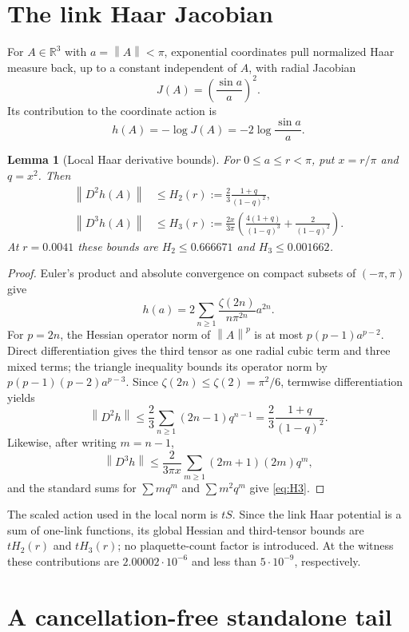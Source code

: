 \documentclass[11pt]{article}
\newtheorem{lemma}[theorem]{Lemma}
\theoremstyle{definition}
\newcommand{\R}{\mathbb{R}}
\newcommand{\norm}[1]{\left\lVert #1\right\rVert}
\begin{document}
\section{The link Haar Jacobian}\label{sec:haar}

For $A\in\R^3$ with $a=\norm A<\pi$, exponential coordinates pull normalized
Haar measure back, up to a constant independent of $A$, with radial Jacobian
\[
 J(A)=\left(\frac{\sin a}{a}\right)^2.
\]
Its contribution to the coordinate action is
\[
 h(A)=-\log J(A)=-2\log\frac{\sin a}{a}.
\]

\begin{lemma}[Local Haar derivative bounds]\label{lem:haar}
For $0\le a\le r<\pi$, put $x=r/\pi$ and $q=x^2$.  Then
\begin{align}
 \norm{D^2h(A)}
 &\le H_2(r):=\frac23\frac{1+q}{(1-q)^2},\label{eq:H2}\\
 \norm{D^3h(A)}
 &\le H_3(r):=\frac{2x}{3\pi}
 \left(\frac{4(1+q)}{(1-q)^3}+\frac{2}{(1-q)^2}\right).
 \label{eq:H3}
\end{align}
At $r=0.0041$ these bounds are $H_2\le0.666671$ and
$H_3\le0.001662$.
\end{lemma}

\begin{proof}
Euler's product and absolute convergence on compact subsets of $(-\pi,\pi)$
give
\[
 h(a)=2\sum_{n\ge1}\frac{\zeta(2n)}{n\pi^{2n}}a^{2n}.
\]
For $p=2n$, the Hessian operator norm of $\norm A^p$ is at most
$p(p-1)a^{p-2}$.  Direct differentiation gives the third tensor as one radial
cubic term and three mixed terms; the triangle inequality bounds its operator
norm by $p(p-1)(p-2)a^{p-3}$.  Since
$\zeta(2n)\le\zeta(2)=\pi^2/6$, termwise differentiation yields
\[
 \norm{D^2h}
 \le \frac23\sum_{n\ge1}(2n-1)q^{n-1}
 =\frac23\frac{1+q}{(1-q)^2}.
\]
Likewise, after writing $m=n-1$,
\[
 \norm{D^3h}
 \le\frac{2}{3\pi x}
 \sum_{m\ge1}(2m+1)(2m)q^m,
\]
and the standard sums for $\sum m q^m$ and $\sum m^2q^m$ give
\eqref{eq:H3}.
\end{proof}

The scaled action used in the local norm is $tS$.  Since the link Haar
potential is a sum of one-link functions, its global Hessian and third-tensor
bounds are $tH_2(r)$ and $tH_3(r)$; no plaquette-count factor is introduced.
At the witness these contributions are $2.00002\cdot10^{-6}$ and less than
$5\cdot10^{-9}$, respectively.

\section{A cancellation-free standalone tail}\label{sec:tail}
\end{document}
